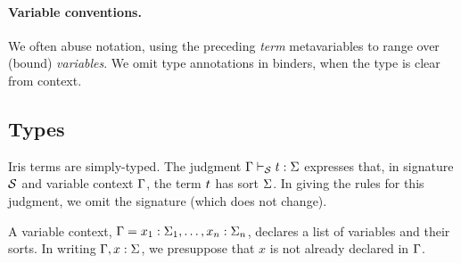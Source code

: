 \paragraph{Variable conventions.}
We often abuse notation, using the preceding \emph{term} metavariables to range over (bound) \emph{variables}.
We omit type annotations in binders, when the type is clear from context.


\subsection{Types}\label{sec:types}

Iris terms are simply-typed.
The judgment $\Gamma \vdash_{\mathcal{S}} t : \Sigma$ expresses that, in signature $\mathcal{S}$ and variable context $\Gamma$, the term $t$ has sort $\Sigma$.
In giving the rules for this judgment, we omit the signature (which does not change).

A variable context, $\Gamma = x_1:\Sigma_1, \dots, x_n:\Sigma_n$, declares a list of variables and their sorts.
In writing $\Gamma, x:\Sigma$, we presuppose that $x$ is not already declared in $\Gamma$.

